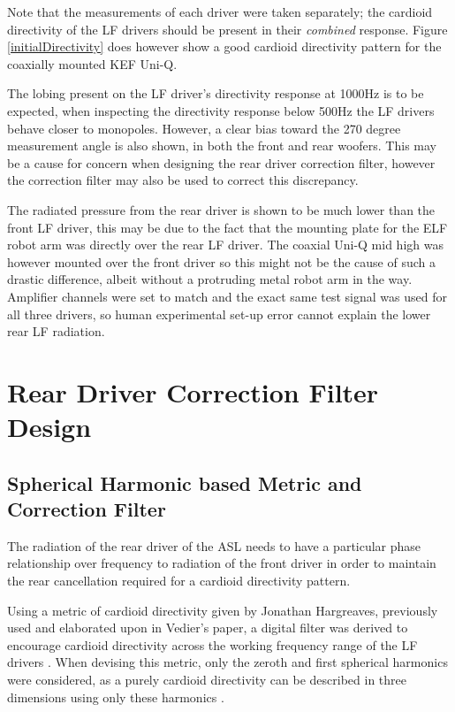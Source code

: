 \documentclass{report}
\begin{document}
        Note that the measurements of each driver were taken separately; the cardioid directivity of the LF drivers should be present in their \textit{combined} response.
        Figure \ref{initialDirectivity} does however show a good cardioid directivity pattern for the coaxially mounted KEF Uni-Q.

        The lobing present on the LF driver's directivity response at 1000Hz is to be expected, when inspecting the directivity response below 500Hz the LF drivers behave closer to monopoles.
        However, a clear bias toward the 270 degree measurement angle is also shown, in both the front and rear woofers.
        This may be a cause for concern when designing the rear driver correction filter, however the correction filter may also be used to correct this discrepancy.

        The radiated pressure from the rear driver is shown to be much lower than the front LF driver, this may be due to the fact that the mounting plate for the ELF robot arm was directly over the rear LF driver.
        The coaxial Uni-Q mid high was however mounted over the front driver so this might not be the cause of such a drastic difference, albeit without a protruding metal robot arm in the way.
        Amplifier channels were set to match and the exact same test signal was used for all three drivers, so human experimental set-up error cannot explain the lower rear LF radiation.

    \section{Rear Driver Correction Filter Design}
        \subsection{Spherical Harmonic based Metric and Correction Filter}
            The radiation of the rear driver of the ASL needs to have a particular phase relationship over frequency to radiation of the front driver in order to maintain the rear cancellation required for a cardioid directivity pattern.
            
            Using a metric of cardioid directivity given by Jonathan Hargreaves, previously used and elaborated upon in Vedier's paper, a digital filter was derived to encourage cardioid directivity across the working frequency range of the LF drivers \cite{vedier} \cite{hargreaves2020spherical}.
            When devising this metric, only the zeroth and first spherical harmonics were considered, as a purely cardioid directivity can be described in three dimensions using only these harmonics \cite{vedier}.
\end{document}
